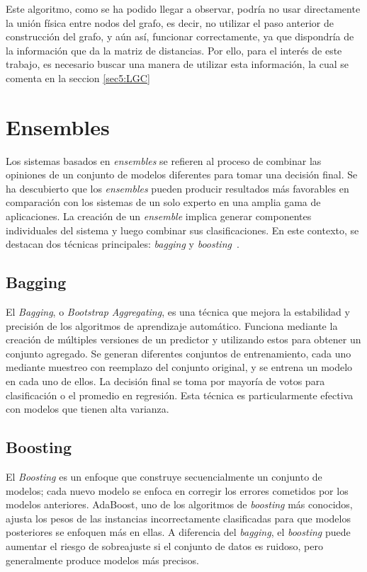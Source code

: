Este algoritmo, como se ha podido llegar a observar, podría no usar directamente la unión física entre nodos del grafo, es decir, no utilizar el paso anterior de construcción del grafo, y aún así, funcionar correctamente, ya que dispondría de la información que da la matriz de distancias. Por ello, para el interés de este trabajo, es necesario buscar una manera de utilizar esta información, la cual se comenta en la seccion \ref{sec5:LGC}
\clearpage
\section{Ensembles}
Los sistemas basados en \textit{ensembles} se refieren al proceso de combinar las opiniones de un conjunto de modelos diferentes para tomar una decisión final. Se ha descubierto que los \textit{ensembles} pueden producir resultados más favorables en comparación con los sistemas de un solo experto en una amplia gama de aplicaciones. La creación de un \textit{ensemble} implica generar componentes individuales del sistema y luego combinar sus clasificaciones. En este contexto, se destacan dos técnicas principales: \textit{bagging} y \textit{boosting}~\cite{ensembles}.

\subsection{Bagging}
El \textit{Bagging}, o \textit{Bootstrap Aggregating}, es una técnica que mejora la estabilidad y precisión de los algoritmos de aprendizaje automático. Funciona mediante la creación de múltiples versiones de un predictor y utilizando estos para obtener un conjunto agregado. Se generan diferentes conjuntos de entrenamiento, cada uno mediante muestreo con reemplazo del conjunto original, y se entrena un modelo en cada uno de ellos. La decisión final se toma por mayoría de votos para clasificación o el promedio en regresión. Esta técnica es particularmente efectiva con modelos que tienen alta varianza.

\subsection{Boosting}
El \textit{Boosting} es un enfoque que construye secuencialmente un conjunto de modelos; cada nuevo modelo se enfoca en corregir los errores cometidos por los modelos anteriores. AdaBoost, uno de los algoritmos de \textit{boosting} más conocidos, ajusta los pesos de las instancias incorrectamente clasificadas para que modelos posteriores se enfoquen más en ellas. A diferencia del \textit{bagging}, el \textit{boosting} puede aumentar el riesgo de sobreajuste si el conjunto de datos es ruidoso, pero generalmente produce modelos más precisos.
